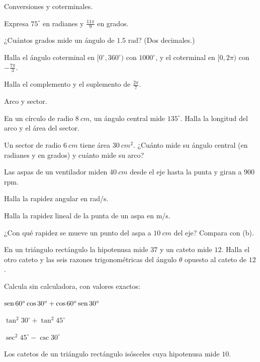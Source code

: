 \documentclass[11pt,a4paper]{article}
\begin{document}
\taller
\begin{ejercicios}
\item Conversiones y coterminales.
  \begin{ejercicios}
  \item Expresa $75^\circ$ en radianes y $\tfrac{11\pi}{9}$ en grados.
  \item ¿Cuántos grados mide un ángulo de $1.5$ rad? (Dos decimales.)
  \item Halla el ángulo coterminal en $[0^\circ,360^\circ)$ con $1000^\circ$, y el coterminal en $[0,2\pi)$ con $-\tfrac{7\pi}{3}$.
  \item Halla el complemento y el suplemento de $\tfrac{2\pi}{7}$.
  \end{ejercicios}
\item Arco y sector.
  \begin{ejercicios}
  \item En un círculo de radio $\SI{8}{cm}$, un ángulo central mide $135^\circ$. Halla la longitud del arco y el área del sector.
  \item Un sector de radio $\SI{6}{cm}$ tiene área $\SI{30}{cm^2}$. ¿Cuánto mide su ángulo central (en radianes y en grados) y cuánto mide su arco?
  \end{ejercicios}
\item Las aspas de un ventilador miden $\SI{40}{cm}$ desde el eje hasta la punta y giran a $900$ rpm.
  \begin{ejercicios}
  \item Halla la rapidez angular en rad/s.
  \item Halla la rapidez lineal de la punta de un aspa en m/s.
  \item ¿Con qué rapidez se mueve un punto del aspa a $\SI{10}{cm}$ del eje? Compara con (b).
  \end{ejercicios}
\item En un triángulo rectángulo la hipotenusa mide $37$ y un cateto mide $12$. Halla el otro cateto y las seis razones
  trigonométricas del ángulo $\theta$ opuesto al cateto de $12$.
\item Calcula sin calculadora, con valores exactos:
  \begin{ejercicios}
  \item $\operatorname{sen}60^\circ\cos30^\circ+\cos60^\circ\operatorname{sen}30^\circ$
  \item $\tan^2 30^\circ+\tan^2 45^\circ$
  \item $\sec^2 45^\circ-\csc30^\circ$
  \item Los catetos de un triángulo rectángulo isósceles cuya hipotenusa mide $10$.

\end{ejercicios}
\end{ejercicios}
\end{document}
